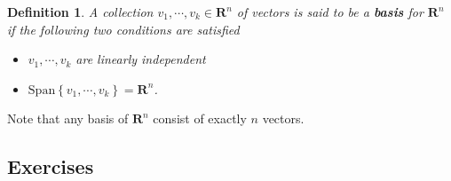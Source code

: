 \documentclass[12pt]{article}
\numberwithin{equation}{subsection}
\numberwithin{figure}{subsection}
\newtheorem{defn}[subsection]{Definition}
\theoremstyle{note}
\newcommand\Span[1]{\mathrm{Span}\left\{#1\right\}}
\begin{document}
\begin{defn} \label{def-basis}
	A collection $v_1,\cdots,v_k\in\mathbf{R}^n$ of vectors is said to be a \textbf{basis} for $\mathbf{R}^n$ if the following two conditions are satisfied
	\begin{itemize}
		\item $v_1,\cdots,v_k$ are linearly independent
		\item $\Span{v_1,\cdots,v_k}=\mathbf{R}^n$.
	\end{itemize}
\end{defn}

Note that any basis of $\mathbf{R}^n$ consist of exactly $n$ vectors. 

\subsection{Exercises}
\end{document}
